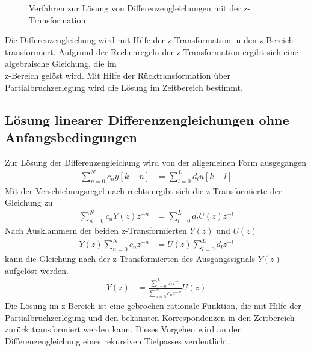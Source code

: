 \begin{figure}
  \centering
  
  \caption{Verfahren zur Lösung von Differenzengleichungen mit der z-Transformation}
  \label{fig:6.1}
\end{figure}

Die Differenzengleichung wird mit Hilfe der z-Transformation in den z-Bereich transformiert. Aufgrund der Rechenregeln der z-Transformation ergibt sich eine algebraische Gleichung, die im\\
z-Bereich gelöst wird. Mit Hilfe der Rücktransformation über Partialbruchzerlegung wird die Lösung im Zeitbereich bestimmt.

\subsection{Lösung linearer Differenzengleichungen ohne Anfangsbedingungen}\label{sec:luxf6sung-linearer-differenzengleichungen-ohne-anfangsbedingungen}

Zur Lösung der Differenzengleichung wird von der allgemeinen Form ausgegangen
\begin{align}
\sum\limits_{n = 0}^{N}{c_{n}  y[ k - n]} &= \sum\limits_{l = 0}^{L}{d_{l}  u[ k - l]} \label{eq:6.1}
\end{align}
Mit der Verschiebungsregel nach rechts ergibt sich die z-Transformierte der Gleichung zu
\begin{align}
\sum\limits_{n = 0}^{N}{c_{n}  Y(z)  z^{- n}} &= \sum\limits_{l = 0}^{L}{d_{l}  U(z)  z^{- l}} \label{eq:6.2}
\end{align}
Nach Ausklammern der beiden z-Transformierten \(Y(z)\) und \(U(z)\)
\begin{align}
Y(z)  \sum\limits_{n = 0}^{N}{c_{n}  z^{- n}} &= U(z)  \sum\limits_{l = 0}^{L}{d_{l}  z^{- l}} \label{eq:6.3}
\end{align}
kann die Gleichung nach der z-Transformierten des Ausgangssignals \(Y(z)\) aufgelöst werden.
\begin{align}
Y(z) &= \frac{\sum\limits_{l = 0}^{L}{d_{l}  z^{- l}}}{\sum\limits_{n = 0}^{N}{c_{n}  z^{- n}}}  U(z) \label{eq:6.4}
\end{align}
Die Lösung im z-Bereich ist eine gebrochen rationale Funktion, die mit Hilfe der Partialbruchzerlegung und den bekannten Korrespondenzen in den Zeitbereich zurück transformiert werden kann. Dieses Vorgehen wird an der Differenzengleichung eines rekursiven Tiefpasses verdeutlicht.

